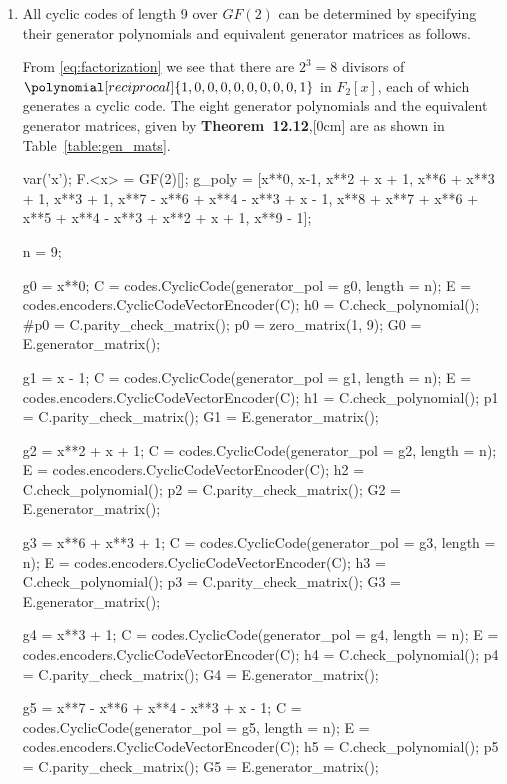 \begin{enumerate}[label=(\roman*)]%
\item%
All cyclic codes of length 9 over $GF(2)$ can be determined by specifying their generator polynomials and equivalent generator matrices as follows.

From \eqref{eq:factorization} we see that there are $2^3 = 8$ divisors of $\polynomial[reciprocal]{1,0,0,0,0,0,0,0,0,1}$ in $F_2[x]$, each of which generates a cyclic code. The eight generator polynomials and the equivalent generator matrices, given by \textbf{Theorem~12.12},[0cm] are as shown in Table~\ref{table:gen_mats}.


\begin{sagesilent}
var('x');
F.<x> = GF(2)[];
g_poly = [x**0, 
	     x-1,
	     x**2 + x + 1, 
	     x**6 + x**3 + 1,
	     x**3 + 1,
	     x**7 - x**6 + x**4 - x**3 + x - 1,
	     x**8 + x**7 + x**6 + x**5 + x**4 - x**3 + x**2 + x + 1,
	     x**9 - 1];
     

n = 9;

g0 = x**0;
C = codes.CyclicCode(generator_pol = g0, length = n);
E = codes.encoders.CyclicCodeVectorEncoder(C);
h0 = C.check_polynomial();
#p0 = C.parity_check_matrix();
p0 = zero_matrix(1, 9);
G0 = E.generator_matrix();

g1 = x - 1;
C = codes.CyclicCode(generator_pol = g1, length = n);
E = codes.encoders.CyclicCodeVectorEncoder(C);
h1 = C.check_polynomial();
p1 = C.parity_check_matrix();
G1 = E.generator_matrix();

g2 = x**2 + x + 1;
C = codes.CyclicCode(generator_pol = g2, length = n);
E = codes.encoders.CyclicCodeVectorEncoder(C);
h2 = C.check_polynomial();
p2 = C.parity_check_matrix();
G2 = E.generator_matrix();

g3 = x**6 + x**3 + 1;
C = codes.CyclicCode(generator_pol = g3, length = n);
E = codes.encoders.CyclicCodeVectorEncoder(C);
h3 = C.check_polynomial();
p3 = C.parity_check_matrix();
G3 = E.generator_matrix();

g4 = x**3 + 1;
C = codes.CyclicCode(generator_pol = g4, length = n);
E = codes.encoders.CyclicCodeVectorEncoder(C);
h4 = C.check_polynomial();
p4 = C.parity_check_matrix();
G4 = E.generator_matrix();

g5 = x**7 - x**6 + x**4 - x**3 + x - 1;
C = codes.CyclicCode(generator_pol = g5, length = n);
E = codes.encoders.CyclicCodeVectorEncoder(C);
h5 = C.check_polynomial();
p5 = C.parity_check_matrix();
G5 = E.generator_matrix();


\end{sagesilent}
\end{enumerate}
